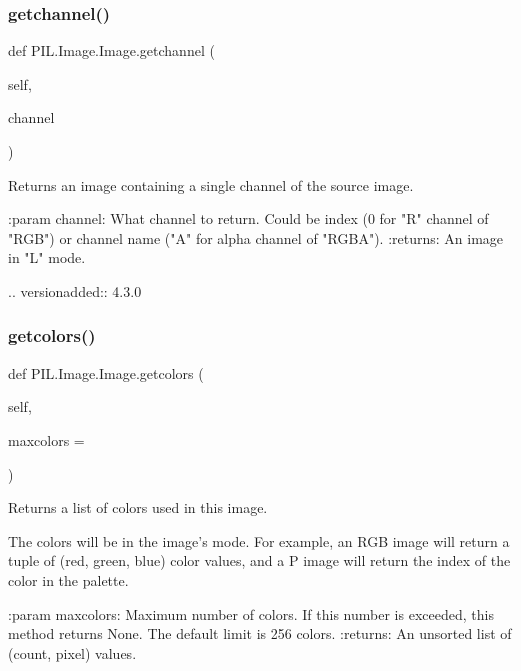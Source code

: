 \subsubsection{\texorpdfstring{getchannel()}{getchannel()}}
{\footnotesize\ttfamily def P\+I\+L.\+Image.\+Image.\+getchannel (\begin{DoxyParamCaption}\item[{}]{self,  }\item[{}]{channel }\end{DoxyParamCaption})}

\begin{DoxyVerb}Returns an image containing a single channel of the source image.

:param channel: What channel to return. Could be index
  (0 for "R" channel of "RGB") or channel name
  ("A" for alpha channel of "RGBA").
:returns: An image in "L" mode.

.. versionadded:: 4.3.0
\end{DoxyVerb}
 \mbox{\label{classPIL_1_1Image_1_1Image_a99e9c0211334cc10130a653a10e1069c}} 
\subsubsection{\texorpdfstring{getcolors()}{getcolors()}}
{\footnotesize\ttfamily def P\+I\+L.\+Image.\+Image.\+getcolors (\begin{DoxyParamCaption}\item[{}]{self,  }\item[{}]{maxcolors = {} }\end{DoxyParamCaption})}

\begin{DoxyVerb}Returns a list of colors used in this image.

The colors will be in the image's mode. For example, an RGB image will
return a tuple of (red, green, blue) color values, and a P image will
return the index of the color in the palette.

:param maxcolors: Maximum number of colors.  If this number is
   exceeded, this method returns None.  The default limit is
   256 colors.
:returns: An unsorted list of (count, pixel) values.
\end{DoxyVerb}
 \mbox{\label{classPIL_1_1Image_1_1Image_aa9e08aac67e35f75aa45c8ff17d1988a}} 
